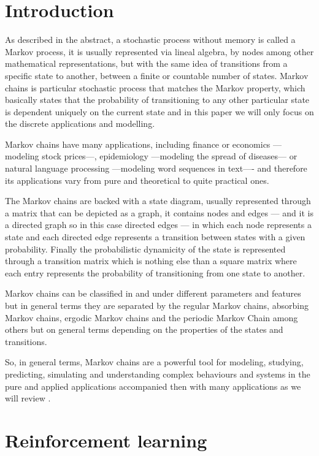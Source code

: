 \documentclass[12pt]{article}
\numberwithin{equation}{section}
\begin{document}
\section{Introduction}

As described in the abstract, a stochastic process without memory is called a Markov process, it is usually represented via lineal algebra, by nodes among other mathematical representations, but with the same idea of transitions from a specific state to another, between a finite or countable number of states. Markov chains is particular stochastic process that matches the Markov property, which basically states that the probability of transitioning to any other particular state is dependent uniquely on the current state and in this paper we will only focus on the discrete applications and modelling.

Markov chains have many applications, including finance or economics ---modeling stock prices---, epidemiology ---modeling the spread of diseases--- or natural language processing ---modeling word sequences in text---- and therefore its applications vary from pure and theoretical to quite practical ones. 

The Markov chains are backed with a state diagram, usually represented through a matrix that can be depicted as a graph, 
it contains nodes and edges --- and it is a directed graph so in this case directed edges --- in which each node represents a state and each directed edge represents a transition between states with a given probability. Finally the probabilistic dynamicity of the state is represented through a transition matrix which is nothing else than a square matrix where each entry represents the probability of transitioning from one state to another.

Markov chains can be classified in and under different parameters and features but in general terms they are separated by the regular Markov chains, absorbing Markov chains, ergodic Markov chains and the periodic Markov Chain among others but on general terms depending on the properties of the states and transitions.

So, in general terms, Markov chains are a powerful tool for modeling, studying, predicting, simulating and understanding complex behaviours and systems in the pure and applied applications accompanied then with many applications as we will review \cite{behrends2000introduction}. 

\section{Reinforcement learning}
\end{document}
